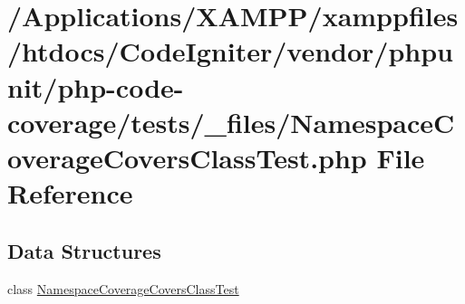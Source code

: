 \hypertarget{php-code-coverage_2tests_2__files_2_namespace_coverage_covers_class_test_8php}{}\section{/\+Applications/\+X\+A\+M\+P\+P/xamppfiles/htdocs/\+Code\+Igniter/vendor/phpunit/php-\/code-\/coverage/tests/\+\_\+files/\+Namespace\+Coverage\+Covers\+Class\+Test.php File Reference}
\label{php-code-coverage_2tests_2__files_2_namespace_coverage_covers_class_test_8php}
\subsection*{Data Structures}
\begin{DoxyCompactItemize}
\item 
class \mbox{\hyperlink{class_namespace_coverage_covers_class_test}{Namespace\+Coverage\+Covers\+Class\+Test}}
\end{DoxyCompactItemize}
